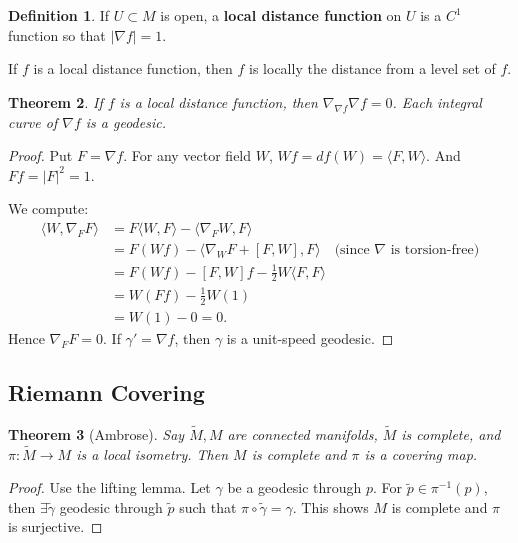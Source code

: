 \documentclass[11pt, a4paper]{article}
\theoremstyle{plain}
\newtheorem{theorem}{Theorem}[section]
\theoremstyle{definition}
\newtheorem{definition}[theorem]{Definition}
\theoremstyle{remark}
\begin{document}
{\begin{definition}
If $U \subset M$ is open, a \textbf{local distance function} on $U$ is a $C^1$ function so that $|\nabla f| = 1$.
\end{definition}

If $f$ is a local distance function, then $f$ is locally the distance from a level set of $f$.

\begin{theorem}
If $f$ is a local distance function, then $\nabla_{\nabla f} \nabla f = 0$. Each integral curve of $\nabla f$ is a geodesic.
\end{theorem}

\begin{proof}
Put $F = \nabla f$. For any vector field $W$, $Wf = df(W) = \langle F, W \rangle$. And $Ff = |F|^2 = 1$.

We compute:
\begin{align*}
\langle W, \nabla_F F \rangle &= F \langle W, F \rangle - \langle \nabla_F W, F \rangle \\
&= F(Wf) - \langle \nabla_W F + [F, W], F \rangle \quad \text{(since $\nabla$ is torsion-free)} \\
&= F(Wf) - [F, W]f - \frac{1}{2} W \langle F, F \rangle \\
&= W(Ff) - \frac{1}{2} W(1) \\
&= W(1) - 0 = 0.
\end{align*}
Hence $\nabla_F F = 0$. If $\gamma' = \nabla f$, then $\gamma$ is a unit-speed geodesic.
\end{proof}

\subsection{Riemann Covering}
\begin{theorem}[Ambrose]
Say $\tilde{M}, M$ are connected manifolds, $\tilde{M}$ is complete, and $\pi: \tilde{M} \to M$ is a local isometry. Then $M$ is complete and $\pi$ is a covering map.
\end{theorem}

\begin{proof}
Use the lifting lemma. Let $\gamma$ be a geodesic through $p$. For $\tilde{p} \in \pi^{-1}(p)$, then $\exists \tilde{\gamma}$ geodesic through $\tilde{p}$ such that $\pi \circ \tilde{\gamma} = \gamma$. This shows $M$ is complete and $\pi$ is surjective.


\end{proof}}
\end{document}
